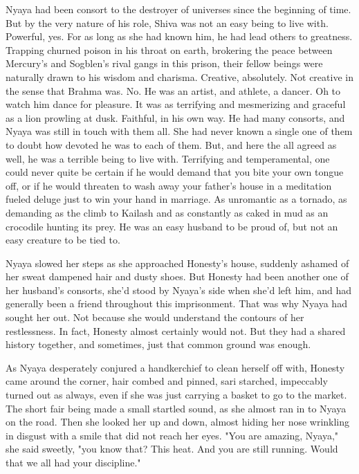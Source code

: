 \documentclass{amsart}
\begin{document}
Nyaya had been consort to the destroyer of universes since the beginning of time. But by the very nature of his role, Shiva was not an easy being to live with. Powerful, yes. For as long as she had known him, he had lead others to greatness. Trapping churned poison in his throat on earth, brokering the peace between Mercury's and Sogblen's rival gangs in this prison, their fellow beings were naturally drawn to his wisdom and charisma. Creative, absolutely. Not creative in the sense that Brahma was. No. He was an artist, and athlete, a dancer. Oh to watch him dance for pleasure. It was as terrifying and mesmerizing and graceful as a lion prowling at dusk. Faithful, in his own way. He had many consorts, and Nyaya was still in touch with them all. She had never known a single one of them to doubt how devoted he was to each of them. But, and here the all agreed as well, he was a terrible being to live with. Terrifying and temperamental, one could never quite be certain if he would demand that you bite your own tongue off, or if he would threaten to wash away your father's house in a meditation fueled deluge just to win your hand in marriage. As unromantic as a tornado, as demanding as the climb to Kailash and as constantly as caked in mud as an crocodile hunting its prey. He was an easy husband to be proud of, but not an easy creature to be tied to.

Nyaya slowed her steps as she approached Honesty's house, suddenly ashamed of her sweat dampened hair and dusty shoes. But Honesty had been another one of her husband's consorts, she'd stood by Nyaya's side when she'd left him, and had generally been a friend throughout this imprisonment. That was why Nyaya had sought her out. Not because she would understand the contours of her restlessness. In fact, Honesty almost certainly would not. But they had a shared history together, and sometimes, just that common ground was enough. 

As Nyaya desperately conjured a handkerchief to clean herself off with, Honesty came around the corner, hair combed and pinned, sari starched, impeccably turned out as always, even if she was just carrying a basket to go to the market. The short fair being made a small startled sound, as she almost ran in to Nyaya on the road. Then she looked her up and down, almost hiding her nose wrinkling in disgust with a smile that did not reach her eyes. "You are amazing, Nyaya," she said sweetly, "you know that? This heat. And you are still running. Would that we all had your discipline."
\end{document}
